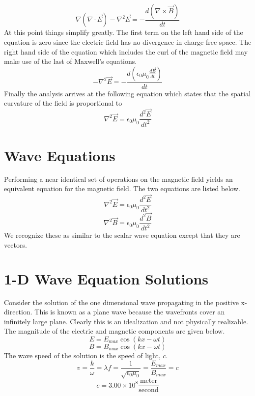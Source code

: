 $$\nabla (\nabla \cdot  \overrightarrow{E})-\nabla^2\overrightarrow{E}= -\frac{d \left( \nabla \times\overrightarrow{B}\right) }{dt} $$
At this point things simplify greatly.  The first term on the left hand side of the equation is zero since the electric field has no divergence in charge free space.  The right hand side of the equation which includes the curl of the magnetic field may make use of the last of Maxwell's equations. 
$$-\nabla^2\overrightarrow{E}= -\frac{d \left( \epsilon_0\mu_0\frac{d\overrightarrow{E}}{dt}\right) }{dt}  $$
Finally the analysis arrives at the following equation which states that the spatial curvature of the field is proportional to 
$$\nabla^2\overrightarrow{E}= \epsilon_0\mu_0\frac{d^2 \overrightarrow{E} }{dt^2}  $$


\section{Wave Equations}
Performing a near identical set of operations on the magnetic field yields an equivalent equation for the magnetic field.  The two equations are listed below.
$$\nabla^2\overrightarrow{E}=\epsilon_0\mu_0\frac{d^2\overrightarrow{E}}{dt^2} $$
$$\nabla^2\overrightarrow{B}=\epsilon_0\mu_0\frac{d^2\overrightarrow{B}}{dt^2} $$
We recognize these as similar to the scalar wave equation except that they are vectors.

\section{1-D Wave Equation Solutions}
Consider the solution of the one dimensional wave propagating in the positive x-direction.  This is known as a plane wave because the wavefronts cover an infinitely large plane.  Clearly this is an idealization and not physically realizable.  The magnitude of the electric and magnetic components are given below.
$$E=E_{max} \cos(kx-\omega t)$$
$$B=B_{max} \cos(kx-\omega t)$$
The wave speed of the solution is the speed of light, $c$.
$$v=\frac{k}{\omega}=\lambda f=\frac{1}{\sqrt{\epsilon_0\mu_0}}=\frac{E_{max}}{B_{max}}=c$$
$$c=3.00\times 10^8 \frac{\text{meter}}{\text{second}}$$

